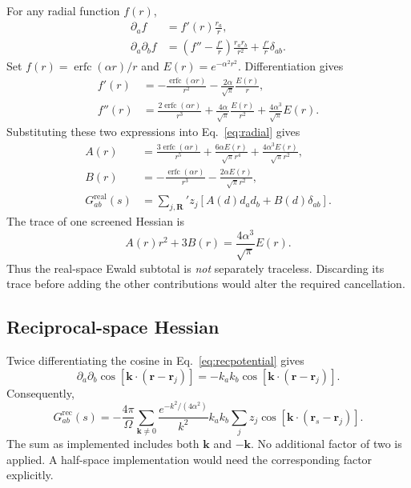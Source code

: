 \documentclass[11pt,a4paper]{article}
\newcommand{\erfc}{\operatorname{erfc}}
\newcommand{\rvec}{\bm r}
\newcommand{\kvec}{\bm k}
\begin{document}
For any radial function $f(r)$,
\begin{align}
 \partial_a f&=f'(r)\frac{r_a}{r},\\
 \partial_a\partial_b f
 &=\left(f''-\frac{f'}r\right)\frac{r_a r_b}{r^2}
 +\frac{f'}r\delta_{ab}.
\label{eq:radial}
\end{align}
Set $f(r)=\erfc(\alpha r)/r$ and $E(r)=e^{-\alpha^2r^2}$. Differentiation gives
\begin{align}
 f'(r)&=-\frac{\erfc(\alpha r)}{r^2}
 -\frac{2\alpha}{\sqrt\pi}\frac{E(r)}r,\\
 f''(r)&=\frac{2\erfc(\alpha r)}{r^3}
 +\frac{4\alpha}{\sqrt\pi}\frac{E(r)}{r^2}
 +\frac{4\alpha^3}{\sqrt\pi}E(r).
\end{align}
Substituting these two expressions into Eq.~\eqref{eq:radial} gives
\begin{align}
 A(r)&=\frac{3\erfc(\alpha r)}{r^5}
 +\frac{6\alpha E(r)}{\sqrt\pi r^4}
 +\frac{4\alpha^3E(r)}{\sqrt\pi r^2},\\
 B(r)&=-\frac{\erfc(\alpha r)}{r^3}
 -\frac{2\alpha E(r)}{\sqrt\pi r^2},\\
 G^{\mathrm{real}}_{ab}(s)
 &=\sum_{j,\bm R}'z_j
 \left[A(d)d_a d_b+B(d)\delta_{ab}\right].
\label{eq:real}
\end{align}
The trace of one screened Hessian is
\begin{equation}
 A(r)r^2+3B(r)=\frac{4\alpha^3}{\sqrt\pi}E(r).
\label{eq:realtrace}
\end{equation}
Thus the real-space Ewald subtotal is \emph{not} separately traceless. Discarding
its trace before adding the other contributions would alter the required
cancellation.

\subsection{Reciprocal-space Hessian}

Twice differentiating the cosine in Eq.~\eqref{eq:recpotential} gives
\begin{equation}
 \partial_a\partial_b\cos[\kvec\cdot(\rvec-\rvec_j)]
 =-k_a k_b\cos[\kvec\cdot(\rvec-\rvec_j)].
\end{equation}
Consequently,
\begin{equation}
 G^{\mathrm{rec}}_{ab}(s)=-\frac{4\pi}{\Omega}
 \sum_{\kvec\ne0}\frac{e^{-k^2/(4\alpha^2)}}{k^2}k_a k_b
 \sum_jz_j\cos[\kvec\cdot(\rvec_s-\rvec_j)].
\label{eq:rec}
\end{equation}
The sum as implemented includes both $\kvec$ and $-\kvec$. No additional factor
of two is applied. A half-space implementation would need the corresponding
factor explicitly.
\end{document}
